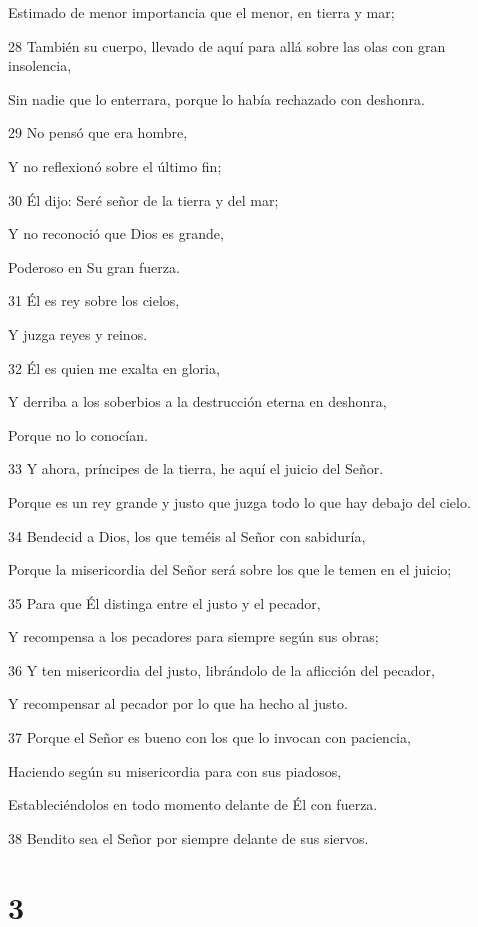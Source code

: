 \par     Estimado de menor importancia que el menor, en tierra y mar;
\par 28 También su cuerpo, llevado de aquí para allá sobre las olas con gran insolencia,
\par     Sin nadie que lo enterrara, porque lo había rechazado con deshonra.
\par 29 No pensó que era hombre,
\par     Y no reflexionó sobre el último fin;
\par 30 Él dijo: Seré señor de la tierra y del mar;
\par     Y no reconoció que Dios es grande,
\par     Poderoso en Su gran fuerza.
\par 31 Él es rey sobre los cielos,
\par     Y juzga reyes y reinos.
\par 32 Él es quien me exalta en gloria,
\par     Y derriba a los soberbios a la destrucción eterna en deshonra,
\par     Porque no lo conocían.
\par 33 Y ahora, príncipes de la tierra, he aquí el juicio del Señor.
\par     Porque es un rey grande y justo que juzga todo lo que hay debajo del cielo.
\par 34 Bendecid a Dios, los que teméis al Señor con sabiduría,
\par     Porque la misericordia del Señor será sobre los que le temen en el juicio;
\par 35 Para que Él distinga entre el justo y el pecador,
\par     Y recompensa a los pecadores para siempre según sus obras;
\par 36 Y ten misericordia del justo, librándolo de la aflicción del pecador,
\par     Y recompensar al pecador por lo que ha hecho al justo.
\par 37 Porque el Señor es bueno con los que lo invocan con paciencia,
\par     Haciendo según su misericordia para con sus piadosos,
\par     Estableciéndolos en todo momento delante de Él con fuerza.
\par 38 Bendito sea el Señor por siempre delante de sus siervos.

\chapter{3}

